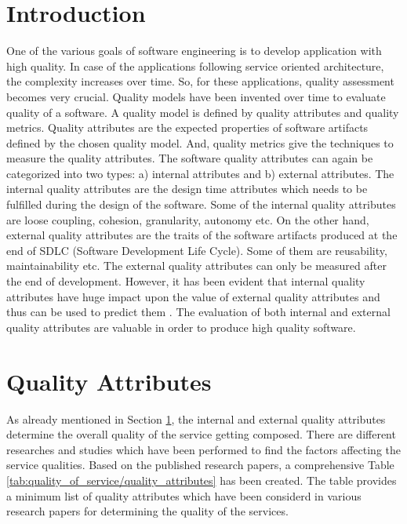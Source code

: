 \section{Introduction}\label{section:quality_of_service/introduction}
One of the various goals of software engineering is to develop application with high quality. In case of the applications following service oriented architecture, the complexity increases over time. So, for these applications, quality assessment becomes very crucial. \cite{Zhang:2009aa, Goeb:2011aa, Nematzadeh:2014aa} Quality models have been invented over time to evaluate quality of a software. A quality model is defined by quality attributes and quality metrics. Quality attributes are the expected properties of software artifacts defined by the chosen quality model. And, quality metrics give the techniques to measure the quality attributes. \cite{Mancioppi:2015aa} The software quality attributes can again be categorized into two types: a) internal attributes and b) external attributes. \cite{Mancioppi:2015aa, Briand:1996aa} The internal quality attributes are the design time attributes which needs to be fulfilled during the design of the software. Some of the internal quality attributes are loose coupling, cohesion, granularity, autonomy etc. \cite{Rostampour:2011aa, Sindhgatta:2015aa, Elhag:2014aa} On the other hand, external quality attributes are the traits of the software artifacts produced at the end of \acrshort{SDLC} (Software Development Life Cycle). Some of them are reusability, maintainability etc. \cite{Elhag:2014aa, Mancioppi:2015aa, Feuerlicht:2007aa, Feuerlicht:2013aa} The external quality attributes can only be measured after the end of development. However, it has been evident that internal quality attributes have huge impact upon the value of external quality attributes and thus can be used to predict them \cite{Henry:1990aa, Briand:2015aa, Alshayeb:2003aa, Bingu-Shim:2008aa}. The evaluation of both internal and external quality attributes are valuable in order to produce high quality software. \cite{Mancioppi:2015aa, Perepletchikov:2007aa, Mikhail-Perepletchikov:2015aa}

\section{Quality Attributes}\label{section:quality_of_service/quality_attributes}
As already mentioned in Section \ref{section:quality_of_service/introduction}, the internal and external quality attributes determine the overall quality of the service getting composed. There are different researches and studies which have been performed to find the factors affecting the service qualities. Based on the published research papers, a comprehensive Table \ref{tab:quality_of_service/quality_attributes} has been created. The table provides a minimum list of quality attributes which have been considerd in various research papers for determining the quality of the services. 

